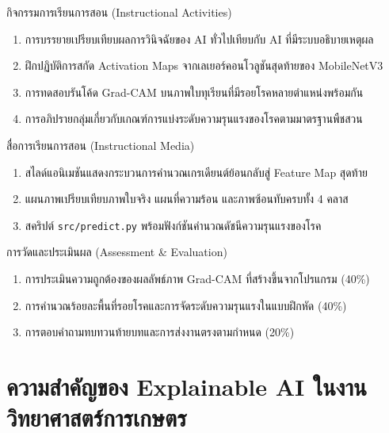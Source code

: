 \begin{planbox}{กิจกรรมการเรียนการสอน (Instructional Activities)}
\begin{enumerate}[leftmargin=1.5em, itemsep=2pt]
    \item การบรรยายเปรียบเทียบผลการวินิจฉัยของ AI ทั่วไปเทียบกับ AI ที่มีระบบอธิบายเหตุผล
    \item ฝึกปฏิบัติการสกัด Activation Maps จากเลเยอร์คอนโวลูชันสุดท้ายของ MobileNetV3
    \item การทดสอบรันโค้ด Grad-CAM บนภาพใบทุเรียนที่มีรอยโรคหลายตำแหน่งพร้อมกัน
    \item การอภิปรายกลุ่มเกี่ยวกับเกณฑ์การแบ่งระดับความรุนแรงของโรคตามมาตรฐานพืชสวน
\end{enumerate}
\end{planbox}

\begin{planbox}{สื่อการเรียนการสอน (Instructional Media)}
\begin{enumerate}[leftmargin=1.5em, itemsep=2pt]
    \item สไลด์แอนิเมชันแสดงกระบวนการคำนวณเกรเดียนต์ย้อนกลับสู่ Feature Map สุดท้าย
    \item แผนภาพเปรียบเทียบภาพใบจริง แผนที่ความร้อน และภาพซ้อนทับครบทั้ง 4 คลาส
    \item สคริปต์ \texttt{src/predict.py} พร้อมฟังก์ชันคำนวณดัชนีความรุนแรงของโรค
\end{enumerate}
\end{planbox}

\begin{planbox}{การวัดและประเมินผล (Assessment \& Evaluation)}
\begin{enumerate}[leftmargin=1.5em, itemsep=2pt]
    \item การประเมินความถูกต้องของผลลัพธ์ภาพ Grad-CAM ที่สร้างขึ้นจากโปรแกรม (40\%)
    \item การคำนวณร้อยละพื้นที่รอยโรคและการจัดระดับความรุนแรงในแบบฝึกหัด (40\%)
    \item การตอบคำถามทบทวนท้ายบทและการส่งงานตรงตามกำหนด (20\%)
\end{enumerate}
\end{planbox}

\clearpage

\section{ความสำคัญของ Explainable AI ในงานวิทยาศาสตร์การเกษตร}

